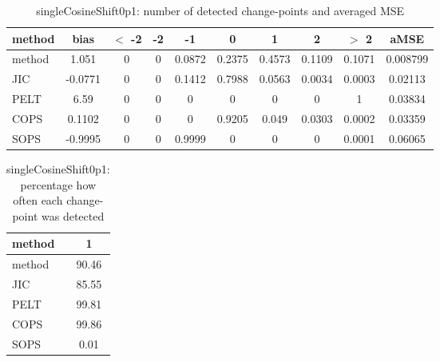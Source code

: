 \begin{table}[ht]
\centering
\begin{tabular}{l|c|ccccccc|c}
  \hline
method & bias & $<$ -2 & -2 & -1 & 0 & 1 & 2 & $>$ 2 & aMSE \\ 
  \hline
method & 1.051 &     0 &     0 & 0.0872 & 0.2375 & 0.4573 & 0.1109 & 0.1071 & 0.008799 \\ 
  JIC & -0.0771 &     0 &     0 & 0.1412 & 0.7988 & 0.0563 & 0.0034 & 0.0003 & 0.02113 \\ 
  PELT &  6.59 &     0 &     0 &     0 &     0 &     0 &     0 &     1 & 0.03834 \\ 
  COPS & 0.1102 &     0 &     0 &     0 & 0.9205 & 0.049 & 0.0303 & 0.0002 & 0.03359 \\ 
  SOPS & -0.9995 &     0 &     0 & 0.9999 &     0 &     0 &     0 & 0.0001 & 0.06065 \\ 
   \hline
\end{tabular}
\caption{singleCosineShift0p1: number of detected change-points and averaged MSE} 
\label{tab:singleCosineShift0p1Njumps}
\end{table}
\begin{table}[ht]
\centering
\begin{tabular}{l|c}
  \hline
method & 1 \\ 
  \hline
method &  90.46 \\ 
  JIC &  85.55 \\ 
  PELT &  99.81 \\ 
  COPS &  99.86 \\ 
  SOPS &   0.01 \\ 
   \hline
\end{tabular}
\caption{singleCosineShift0p1: percentage how often each change-point was detected} 
\label{tab:singleCosineShift0p1Detections}
\end{table}
